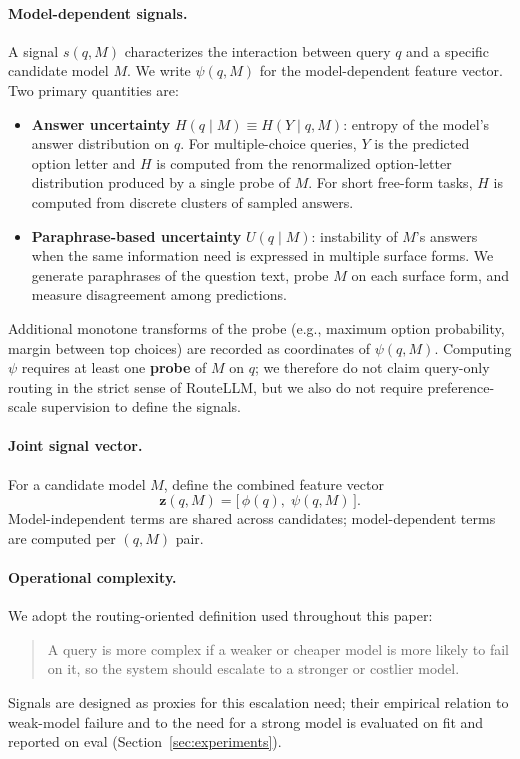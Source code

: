 \paragraph{Model-dependent signals.}
A signal $s(q,M)$ characterizes the interaction between query $q$ and a specific candidate model $M$.
We write $\psi(q,M)$ for the model-dependent feature vector.
Two primary quantities are:
\begin{itemize}
    \item \textbf{Answer uncertainty} $H(q\mid M)\equiv H(Y\mid q,M)$: entropy of the model's answer distribution on $q$.
    For multiple-choice queries, $Y$ is the predicted option letter and $H$ is computed from the renormalized option-letter distribution produced by a single probe of $M$.
    For short free-form tasks, $H$ is computed from discrete clusters of sampled answers.
    \item \textbf{Paraphrase-based uncertainty} $U(q\mid M)$: instability of $M$'s answers when the same information need is expressed in multiple surface forms.
    We generate paraphrases of the question text, probe $M$ on each surface form, and measure disagreement among predictions.
\end{itemize}
Additional monotone transforms of the probe (e.g., maximum option probability, margin between top choices) are recorded as coordinates of $\psi(q,M)$.
Computing $\psi$ requires at least one \textbf{probe} of $M$ on $q$; we therefore do not claim query-only routing in the strict sense of RouteLLM, but we also do not require preference-scale supervision to define the signals.

\paragraph{Joint signal vector.}
For a candidate model $M$, define the combined feature vector
\begin{equation}
\mathbf{z}(q,M)=\bigl[\,\phi(q),\;\psi(q,M)\,\bigr].
\end{equation}
Model-independent terms are shared across candidates; model-dependent terms are computed per $(q,M)$ pair.

\paragraph{Operational complexity.}
We adopt the routing-oriented definition used throughout this paper:
\begin{quote}
A query is more complex if a weaker or cheaper model is more likely to fail on it, so the system should escalate to a stronger or costlier model.
\end{quote}
Signals are designed as proxies for this escalation need; their empirical relation to weak-model failure and to the need for a strong model is evaluated on fit and reported on eval (Section~\ref{sec:experiments}).

